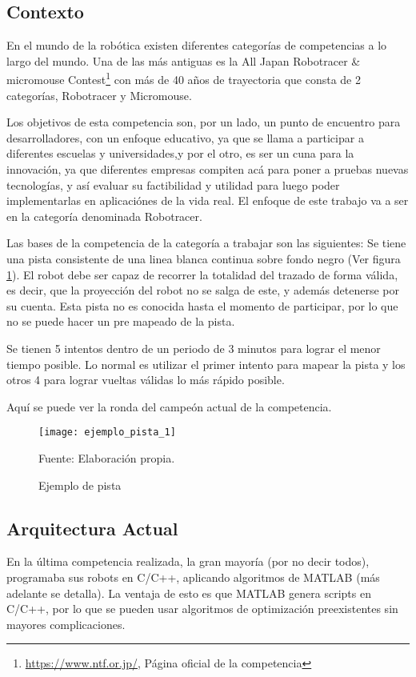 
\subsection{Contexto}

En el mundo de la robótica existen diferentes categorías de competencias a lo largo del mundo. Una de las más antiguas es la All Japan Robotracer \& micromouse Contest\footnote{\url{https://www.ntf.or.jp/}, Página oficial de la competencia} con más de 40 años de trayectoria que consta de 2 categorías, Robotracer y Micromouse. 

Los objetivos de esta competencia son, por un lado, un punto de encuentro para desarrolladores, con un enfoque educativo, ya que se llama a participar a diferentes escuelas y universidades,y por el otro, es ser un cuna para la innovación, ya que diferentes empresas compiten acá para poner a pruebas nuevas tecnologías, y así evaluar su factibilidad y utilidad para luego poder implementarlas en aplicaciónes de la vida real. El enfoque de este trabajo va a ser en la categoría denominada Robotracer.

Las bases de la competencia de la categoría a trabajar son las siguientes: Se tiene una pista consistente de una linea blanca continua sobre fondo negro (Ver figura \ref{fig:pista1}). El robot debe ser capaz de recorrer la totalidad del trazado de forma válida, es decir, que la proyección del robot no se salga de este, y además detenerse por su cuenta. Esta pista no es conocida hasta el momento de participar, por lo que no se puede hacer un pre mapeado de la pista.

Se tienen 5 intentos dentro de un periodo de 3 minutos para lograr el menor tiempo posible. Lo normal es utilizar el primer intento para mapear la pista y los otros 4 para lograr vueltas válidas lo más rápido posible.

Aquí se puede ver la ronda del campeón actual de la competencia. \cite{ganador2023}

\begin{figure}[h]
\centering
\texttt{[image: ejemplo\_pista\_1]}
\caption{\label{fig:pista1} Ejemplo de pista} Fuente: Elaboración propia.
\end{figure}

\subsection{Arquitectura Actual}
En la última competencia realizada, la gran mayoría (por no decir todos), programaba sus robots en C/C++, aplicando algoritmos de MATLAB (más adelante se detalla). La ventaja de esto es que MATLAB genera scripts en C/C++, por lo que se pueden usar algoritmos de optimización preexistentes sin mayores complicaciones.

